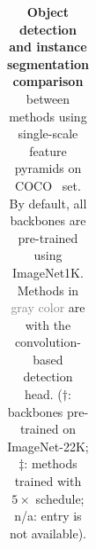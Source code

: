 \begin{table}[h!]
{{\begin{tabular}{lcccccccccc}
        \end{tabular}
        }
        }
        \caption{\textbf{Object detection and instance segmentation comparison} between methods using single-scale \vs feature pyramids on COCO~\citep{lin2014mscoco} \val set. By default, all backbones are pre-trained using ImageNet1K. Methods in \textcolor{gray}{gray color} are with the convolution-based detection head. ($\dag$: backbones pre-trained on ImageNet-22K; $\ddag$: methods trained with $5\times$ schedule; n/a: entry is not available).}
        \label{tab:det_main}
        \end{table}
